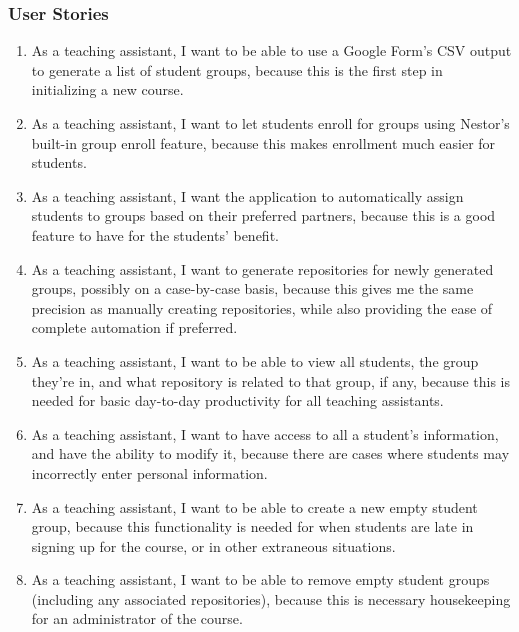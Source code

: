\documentclass{article}
\begin{document}
		\subsubsection{User Stories}
			\begin{enumerate}
				\item As a teaching assistant, I want to be able to use a Google Form's CSV output to generate a list of student groups, because this is the first step in initializing a new course.
				
				\item As a teaching assistant, I want to let students enroll for groups using Nestor's built-in group enroll feature, because this makes enrollment much easier for students.
				
				\item As a teaching assistant, I want the application to automatically assign students to groups based on their preferred partners, because this is a good feature to have for the students' benefit.
				
				\item As a teaching assistant, I want to generate repositories for newly generated groups, possibly on a case-by-case basis, because this gives me the same precision as manually creating repositories, while also providing the ease of complete automation if preferred.
				
				\item As a teaching assistant, I want to be able to view all students, the group they're in, and what repository is related to that group, if any, because this is needed for basic day-to-day productivity for all teaching assistants.
				
				\item As a teaching assistant, I want to have access to all a student's information, and have the ability to modify it, because there are cases where students may incorrectly enter personal information.
				
				\item As a teaching assistant, I want to be able to create a new empty student group, because this functionality is needed for when students are late in signing up for the course, or in other extraneous situations.
				
				\item As a teaching assistant, I want to be able to remove empty student groups (including any associated repositories), because this is necessary housekeeping for an administrator of the course.
				

\end{enumerate}
\end{document}
